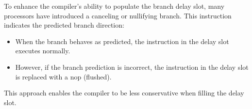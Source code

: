 To enhance the compiler's ability to populate the branch delay slot, many processors have introduced a canceling or nullifying branch. 
This instruction indicates the predicted branch direction:
\begin{itemize}
    \item When the branch behaves as predicted, the instruction in the delay slot executes normally.
    \item However, if the branch prediction is incorrect, the instruction in the delay slot is replaced with a nop (flushed).
\end{itemize}
This approach enables the compiler to be less conservative when filling the delay slot.